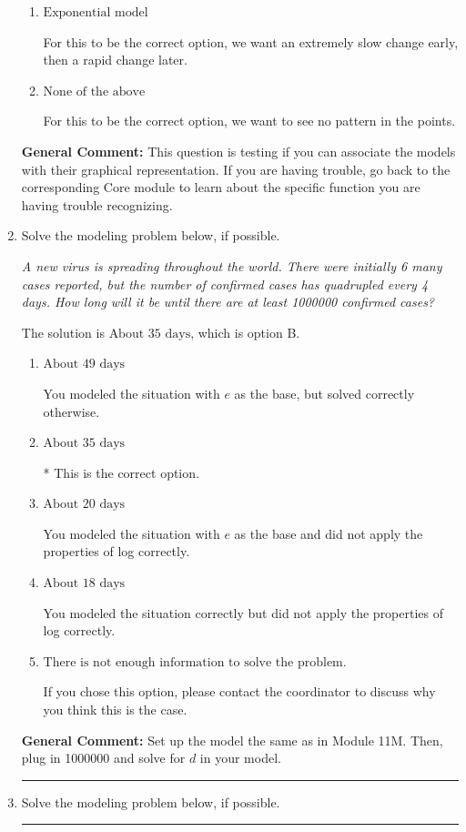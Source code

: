\documentclass{extbook}[14pt]
\newcommand{\litem}[1]{\item #1

\rule{\textwidth}{0.4pt}}
\begin{document}
\begin{enumerate}
{\begin{enumerate}[label=\Alph*.]
For this to be the correct option, we need to see a polynomial or rational shape.
\item \( \text{Exponential model} \)

For this to be the correct option, we want an extremely slow change early, then a rapid change later.
\item \( \text{None of the above} \)

For this to be the correct option, we want to see no pattern in the points.
\end{enumerate}

\textbf{General Comment:} This question is testing if you can associate the models with their graphical representation. If you are having trouble, go back to the corresponding Core module to learn about the specific function you are having trouble recognizing.
}
\litem{
Solve the modeling problem below, if possible.

\begin{center}
    \textit{ A new virus is spreading throughout the world. There were initially 6 many cases reported, but the number of confirmed cases has quadrupled every 4 days. How long will it be until there are at least 1000000 confirmed cases? }
\end{center}
The solution is \( \text{About } 35 \text{ days} \), which is option B.\begin{enumerate}[label=\Alph*.]
\item \( \text{About } 49 \text{ days} \)

You modeled the situation with $e$ as the base, but solved correctly otherwise.
\item \( \text{About } 35 \text{ days} \)

* This is the correct option.
\item \( \text{About } 20 \text{ days} \)

You modeled the situation with $e$ as the base and did not apply the properties of log correctly.
\item \( \text{About } 18 \text{ days} \)

You modeled the situation correctly but did not apply the properties of log correctly.
\item \( \text{There is not enough information to solve the problem.} \)

If you chose this option, please contact the coordinator to discuss why you think this is the case.
\end{enumerate}

\textbf{General Comment:} Set up the model the same as in Module 11M. Then, plug in 1000000 and solve for $d$ in your model.
}
\litem{
Solve the modeling problem below, if possible.

}
\end{enumerate}
\end{document}
